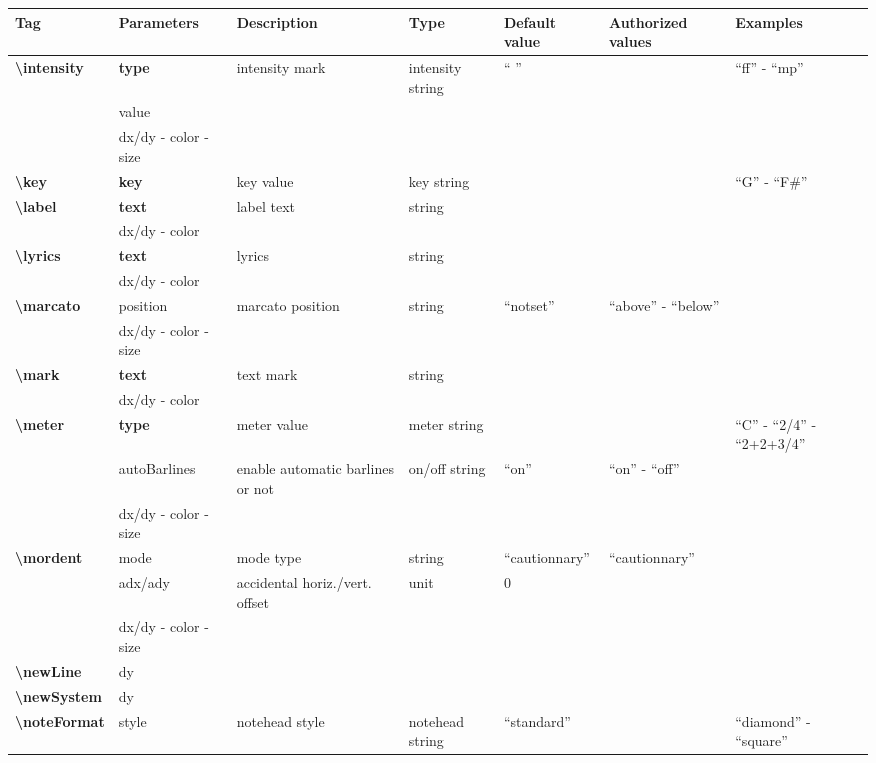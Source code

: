 \documentclass[a4paper, landscape, 10pt]{article}
\begin{document}
\begin{tabularx}{\linewidth}{p{3cm}p{3cm}p{5cm}p{3cm}p{2.5cm}p{3.5cm}p{4cm}}
    \hline
    \textbf{Tag}&\textbf{Parameters}&\textbf{Description}&\textbf{Type}&\textbf{Default value}&\textbf{Authorized values}&\textbf{Examples}\\
    \hline
    \textbf{\textbackslash{}intensity}&\textbf{type}&intensity mark&intensity string&`` ''&&``ff'' - ``mp''\\
    &value&&&&&\\ %
    &dx/dy - color - size&&&&&\\
    \hline
    \textbf{\textbackslash{}key}&\textbf{key}&key value&key string&&&``G'' - ``F\#''\\
    \hline
    \textbf{\textbackslash{}label}&\textbf{text}&label text&string&&&\\
    &dx/dy - color&&&&&\\
    \hline
    \textbf{\textbackslash{}lyrics}&\textbf{text}&lyrics&string&&&\\
    &dx/dy - color&&&&&\\
    \hline
    \textbf{\textbackslash{}marcato}&position&marcato position&string&``notset''&``above'' - ``below''&\\
    &dx/dy - color - size&&&&&\\
    \hline
    \textbf{\textbackslash{}mark}&\textbf{text}&text mark&string&&&\\
    &dx/dy - color&&&&&\\
    \hline
    \textbf{\textbackslash{}meter}&\textbf{type}&meter value&meter string&&&``C'' - ``2/4'' - ``2+2+3/4''\\
    &autoBarlines&enable automatic barlines or not&on/off string&``on''&``on'' - ``off''&\\
    &dx/dy - color - size&&&&&\\
    \hline
    \textbf{\textbackslash{}mordent}&mode&mode type&string&``cautionnary''&``cautionnary''&\\
    &adx/ady&accidental horiz./vert. offset&unit&0&&\\
    &dx/dy - color - size&&&&&\\
    \hline
    \textbf{\textbackslash{}newLine}&dy&&&&&\\ %
    \hline
    \textbf{\textbackslash{}newSystem}&dy&&&&&\\ %
    \hline
    \textbf{\textbackslash{}noteFormat}&style&notehead style&notehead string&``standard''&&``diamond'' - ``square''\\

\end{tabularx}
\end{document}
